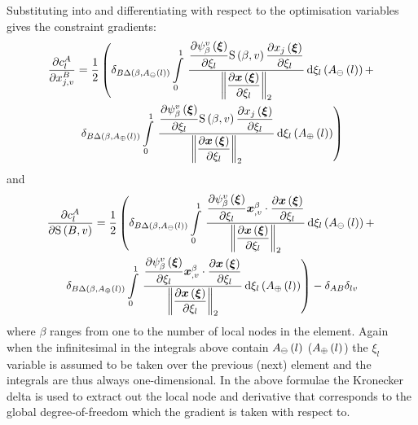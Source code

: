 Substituting  into 
and differentiating with respect to the optimisation variables gives the
constraint gradients: 
\begin{multline}
  \delby{c_{l}^{A}}{x^{B}_{j,v}}=\dfrac{1}{2}\left(
  \kronecker{B}{\fnof{\Delta}{\beta,\fnof{A_{\ominus}}{l}}}
  \gint{0}{1}{\dfrac{
      \delby{\gbfn{\beta}{v}{\vectr{\xi}}}{\xi_{l}}\gsf{\beta}{v}
      \delby{\fnof{x_{j}}{\vectr{\xi}}}{\xi_{l}}}{\norm{\delby{\fnof{
            \vectr{x}}{\vectr{\xi}}}{\xi_{l}}}
  }}{
    \fnof{\xi_{l}}{\fnof{A_{\ominus}}{l}}
  }
  +\right.\\  
  \left.
  \kronecker{B}{\fnof{\Delta}{\beta,\fnof{A_{\oplus}}{l}}}
  \gint{0}{1}{\dfrac{
      \delby{\gbfn{\beta}{v}{\vectr{\xi}}}{\xi_{l}}\gsf{\beta}{v}\delby{\fnof{x_{j}}{
            \vectr{\xi}}}{\xi_{l}}}{\norm{\delby{\fnof{\vectr{x}}{
            \vectr{\xi}}}{\xi_{l}}}
  }}{
    \fnof{\xi_{l}}{\fnof{A_{\oplus}}{l}}
  }
  \right) 
  \label{eqn:arclenjacnode}
\end{multline}
and
\begin{multline}  
  \delby{c_{l}^{A}}{\gsf{B}{v}}=\dfrac{1}{2}\left(\kronecker{B}{
      \fnof{\Delta}{\beta,\fnof{A_{\ominus}}{l}}}\gint{0}{1}{\dfrac{\delby{
          \gbfn{\beta}{v}{\vectr{\xi}}}{\xi_{l}}\dotprod{
            \vectr{x}^{\beta}_{,v}}{\delby{\fnof{\vectr{x}}{\vectr{\xi}}}{
            \xi_{l}}}}{\norm{\delby{\fnof{\vectr{x}}{\vectr{\xi}}}{\xi_{l}}}}}{
      \fnof{\xi_{l}}{\fnof{A_{\ominus}}{l}}}+\right. \\ 
  \left.\kronecker{B}{\fnof{\Delta}{\beta,\fnof{A_{\oplus}}{l}}}\gint{0}{1}{
      \dfrac{\delby{\gbfn{\beta}{v}{\vectr{\xi}}}{\xi_{l}}\dotprod{\vectr{x}^{
            \beta}_{,v}}{\delby{\fnof{\vectr{x}}{\vectr{\xi}}}
          {\xi_{l}}}}{\norm{\delby{\fnof{\vectr{x}}{\vectr{\xi}}}{\xi_{l}}}}}{
      \fnof{\xi_{l}}{\fnof{A_{\oplus}}{l}}}\right)-
  \kronecker{A}{B}\kronecker{l}{v} \label{eqn:arclenjacline}
\end{multline}
where $\beta$ ranges from one to the number of local nodes in the element.
Again when the infinitesimal in the integrals above contain
$ A_{\ominus}\left( l \right) $ ($ A_{\oplus}\left( l \right) $) the $\xi_{l}$ variable is
assumed to be taken over the previous (next) element and the integrals are
thus always one-dimensional. In the above formulae the Kronecker delta is used to
extract out the local node and derivative that corresponds to the global
degree-of-freedom which the gradient is taken with respect to.

